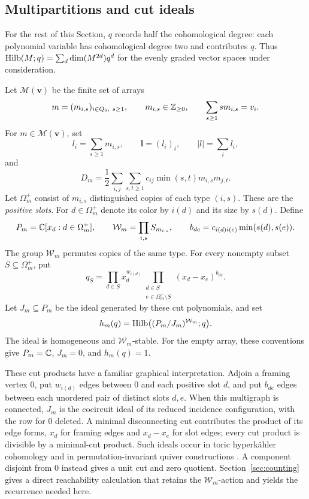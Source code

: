 \subsection{Multipartitions and cut ideals}

For the rest of this Section, $q$ records half the cohomological degree:
each polynomial variable has cohomological degree two and contributes $q$.
Thus
$\operatorname{Hilb}(M;q)=\sum_d\dim(M^{2d})q^d$ for the evenly graded vector spaces
under consideration.

Let $\mathcal M(\mathbf v)$ be the finite set of arrays
\[
 m=(m_{i,s})_{i\in Q_0,\ s\geq1},\qquad
 m_{i,s}\in\mathbb Z_{\geq0},\qquad \sum_{s\geq1}s m_{i,s}=v_i.
\]
For $m\in\mathcal M(\mathbf v)$, set
\[
 l_i=\sum_{s\geq1}m_{i,s},\qquad
 \mathbf l=(l_i)_i,\qquad |l|=\sum_i l_i,
\]
and
\[
 D_m=\frac12\sum_{i,j}\sum_{s,t\geq1}
                c_{ij}\min(s,t)m_{i,s}m_{j,t}.
\]
Let $\Omega_m^+$ consist of $m_{i,s}$ distinguished copies of each
type $(i,s)$.  These are the \emph{positive slots}.  For
$d\in\Omega_m^+$ denote its color by $i(d)$ and its size by $s(d)$.
Define
\[
 P_m=\mathbb C[x_d:d\in\Omega_m^+],\qquad
 \mathcal W_m=\prod_{i,s}S_{m_{i,s}},\qquad
 b_{de}=c_{i(d)i(e)}\min(s(d),s(e)).
\]
The group $\mathcal W_m$ permutes copies of the same type.  For every
nonempty subset $S\subseteq\Omega_m^+$, put
\begin{equation}\label{eq:cut-polynomial}
 q_S=
 \prod_{d\in S}x_d^{w_{i(d)}}
 \prod_{\substack{d\in S\\ e\in\Omega_m^+\setminus S}}
                    (x_d-x_e)^{b_{de}}.
\end{equation}
Let $J_m\subseteq P_m$ be the ideal generated by these cut polynomials,
and set
\[
 h_m(q)=\operatorname{Hilb}\bigl((P_m/J_m)^{\mathcal W_m};q\bigr).
\]
The ideal is homogeneous and $\mathcal W_m$-stable.  For the empty
array, these conventions give $P_m=\mathbb C$, $J_m=0$, and $h_m(q)=1$.

These cut products have a familiar graphical interpretation.
Adjoin a framing vertex $0$, put $w_{i(d)}$ edges between $0$ and each
positive slot $d$, and put $b_{de}$ edges between each unordered pair
of distinct slots $d,e$.
When this multigraph is connected, $J_m$ is the cocircuit ideal of its
reduced incidence configuration, with the row for $0$ deleted.
A minimal disconnecting cut contributes the product of its edge forms,
$x_d$ for framing edges and $x_d-x_e$ for slot edges; every cut product
is divisible by a minimal-cut product.
Such ideals occur in toric hyperk\"ahler cohomology
\cite[Section~7, Equation~(37)]{HauselSturmfels02} and in
permutation-invariant quiver constructions
\cite[Sections~2 and 4.4]{ReinekeRhoadesTewari23}.
A component disjoint from $0$ instead gives a unit cut and zero quotient.
Section~\ref{sec:counting} gives a direct reachability calculation that
retains the $\mathcal W_m$-action and yields the recurrence needed here.

